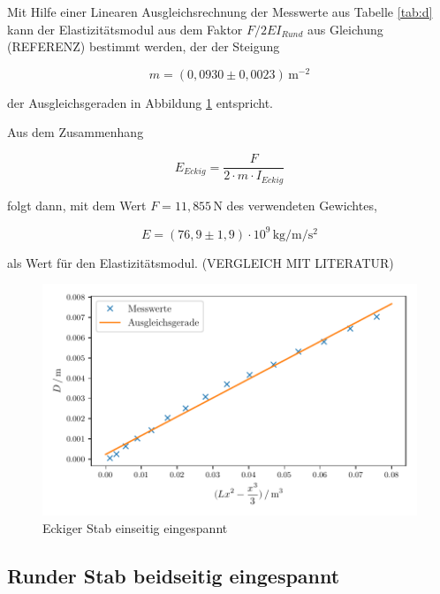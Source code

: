 Mit Hilfe einer Linearen Ausgleichsrechnung der Messwerte
aus Tabelle \ref{tab:d} kann der Elastizitätsmodul aus dem 
Faktor $F/2EI_{Rund}$ aus Gleichung (REFERENZ) bestimmt werden, der der Steigung 

\begin{equation*}
  m=(0,0930 \pm 0,0023)\,\si{\meter\tothe{-2}}
\end{equation*}

\noindent der Ausgleichsgeraden
in Abbildung \ref{fig:b} entspricht.

Aus dem Zusammenhang 

\begin{equation}
  E_{Eckig}=\frac{F}{2 \cdot m \cdot I_{Eckig}}
\end{equation}

\noindent folgt dann, mit dem Wert $F=11,855\,\si{\newton}$ des verwendeten Gewichtes,

\begin{equation*}
  E=(76,9 \pm 1,9) \cdot 10^9 \,\si{\kilo\gram\per\meter\per\second\squared}
\end{equation*}

\noindent als Wert für den Elastizitätsmodul. (VERGLEICH MIT LITERATUR)



\begin{figure}[H]
  \centering
  \includegraphics{build/plot2.pdf}
  \caption{Eckiger Stab einseitig eingespannt}
  \label{fig:b}
\end{figure}






\subsection{Runder Stab beidseitig eingespannt}


